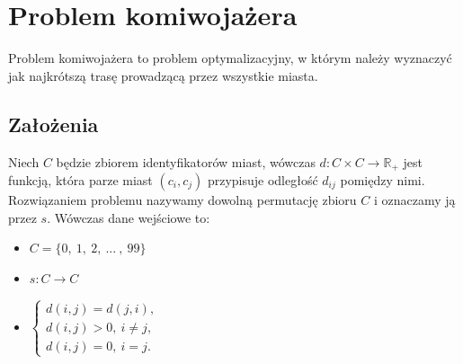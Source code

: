 \documentclass{article}
\begin{document}
	\section{Problem komiwojażera}
	Problem komiwojażera to problem optymalizacyjny, w którym należy wyznaczyć jak
	najkrótszą trasę prowadzącą przez wszystkie miasta.
	\subsection{Założenia}
	Niech $C$ będzie zbiorem identyfikatorów miast, wówczas $d:C\times C\rightarrow
	\mathbb{R_+}$ jest funkcją, która parze miast $(c_{i},c_{j})$ przypisuje
	odległość $d_{ij}$ pomiędzy nimi. Rozwiązaniem problemu nazywamy dowolną permutację
	zbioru $C$ i oznaczamy ją przez $s$. Wówczas dane wejściowe to:
	\begin{itemize}
		\item $C=\{0,\ 1,\ 2,\ ...\ ,\ 99\}$

		\item $s:C\rightarrow C$

		\item $\left\{
			\begin{array}{l}
				d(i,j) = d(j,i),      \\
				d(i,j) > 0,\ i\neq j, \\
				d(i,j)=0,\ i=j.
			\end{array}\right.$
	\end{itemize}
\end{document}
